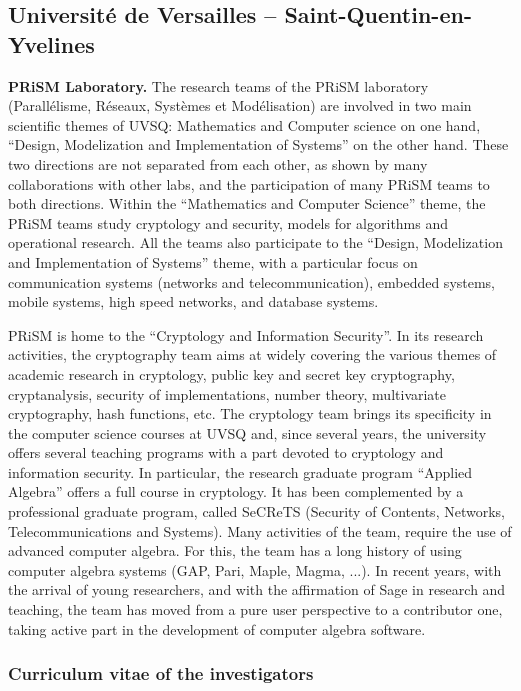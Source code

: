 
\subsection*{Université de Versailles -- Saint-Quentin-en-Yvelines}

{\bf PRiSM Laboratory.} The research teams of the PRiSM laboratory
(Parall\'elisme, Réseaux, Syst\`emes et Mod\'elisation) are involved
in two main scientific themes of UVSQ: Mathematics and Computer
science on one hand, ``Design, Modelization and Implementation of
Systems'' on the other hand. These two directions are not separated
from each other, as shown by many collaborations with other labs, and
the participation of many PRiSM teams to both directions. Within the
``Mathematics and Computer Science'' theme, the PRiSM teams study
cryptology and security, models for algorithms and operational
research. All the teams also participate to the ``Design, Modelization
and Implementation of Systems'' theme, with a particular focus on
communication systems (networks and telecommunication), embedded
systems, mobile systems, high speed networks, and database systems.

PRiSM is home to the ``Cryptology and Information Security''. In its
research activities, the cryptography team aims at widely covering the
various themes of academic research in cryptology, public key and
secret key cryptography, cryptanalysis, security of implementations,
number theory, multivariate cryptography, hash functions, etc. The
cryptology team brings its specificity in the computer science courses
at UVSQ and, since several years, the university offers several
teaching programs with a part devoted to cryptology and information
security. In particular, the research graduate program ``Applied
Algebra'' offers a full course in cryptology. It has been complemented
by a professional graduate program, called SeCReTS (Security of
Contents, Networks, Telecommunications and Systems). Many activities
of the team, require the use of advanced computer algebra. For this,
the team has a long history of using computer algebra systems (GAP,
Pari, Maple, Magma, ...). In recent years, with the arrival of young
researchers, and with the affirmation of Sage in research and
teaching, the team has moved from a pure user perspective to a
contributor one, taking active part in the development of computer
algebra software.


\subsubsection*{Curriculum vitae of the investigators}

